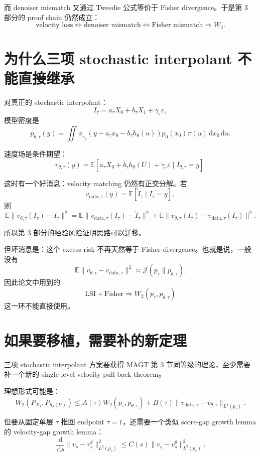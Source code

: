 \documentclass[UTF8,11pt]{ctexart}
\newcommand{\E}{\mathbb{E}}
\newcommand{\dd}{\,\mathrm{d}}
\begin{document}
而 denoiser mismatch 又通过 Tweedie 公式等价于 Fisher divergence。于是第 3 部分的 proof chain 仍然成立：
\[
\text{velocity loss}
\Longleftrightarrow
\text{denoiser mismatch}
\Longleftrightarrow
\text{Fisher mismatch}
\Longrightarrow
W_2.
\]

\section{为什么三项 stochastic interpolant 不能直接继承}

对真正的 stochastic interpolant：
\[
I_\tau=a_\tau X_0+b_\tau X_1+\gamma_\tau\varepsilon,
\]
模型密度是
\[
p_{\theta,\tau}(y)
=
\iint
\phi_{\gamma_\tau}
\left(
y-a_\tau x_0-b_\tau h_\theta(u)
\right)
p_0(x_0)\pi(u)\dd x_0\dd u.
\]

速度场是条件期望：
\[
v_{\theta,\tau}(y)
=
\E[
\dot a_\tau X_0+\dot b_\tau h_\theta(U)+\dot\gamma_\tau\varepsilon
\mid I_{\theta,\tau}=y].
\]

这时有一个好消息：velocity matching 仍然有正交分解。若
\[
v_{\mathrm{data},\tau}(y)
=
\E[\dot I_\tau\mid I_\tau=y],
\]
则
\[
\E\|v_{\theta,\tau}(I_\tau)-\dot I_\tau\|^2
=
\E\|v_{\mathrm{data},\tau}(I_\tau)-\dot I_\tau\|^2
+
\E\|v_{\theta,\tau}(I_\tau)-v_{\mathrm{data},\tau}(I_\tau)\|^2.
\]

所以第 3 部分的经验风险证明思路可以迁移。

但坏消息是：这个 excess risk 不再天然等于 Fisher divergence。也就是说，一般没有
\[
\E\|v_{\theta,\tau}-v_{\mathrm{data},\tau}\|^2
\asymp
\mathcal J(p_\tau\|p_{\theta,\tau}).
\]
因此论文中用到的
\[
\text{LSI}+\text{Fisher}
\Longrightarrow
W_2(p_\tau,p_{\theta,\tau})
\]
这一环不能直接使用。

\section{如果要移植，需要补的新定理}

三项 stochastic interpolant 方案要获得 MAGT 第 3 节同等级的理论，至少需要补一个新的 single-level velocity pull-back theorem。

理想形式可能是：
\[
W_2(P_{X_1},P_{h_\theta(U)})
\le
A(\tau)W_2(p_\tau,p_{\theta,\tau})
+
B(\tau)
\|v_{\mathrm{data},\tau}-v_{\theta,\tau}\|_{L^2(p_\tau)}.
\]

但要从固定单层 \(\tau\) 推回 endpoint \(\tau=1\)，还需要一个类似 score-gap growth lemma 的 velocity-gap growth lemma：
\[
\frac{\dd}{\dd s}
\|v_s-v_s^\theta\|_{L^2(p_s)}^2
\le
C(s)
\|v_s-v_s^\theta\|_{L^2(p_s)}^2.
\]
\end{document}
